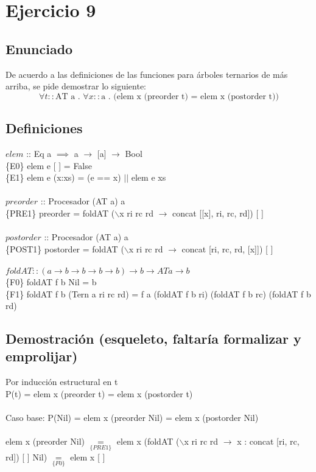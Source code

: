 \documentclass[10pt,a4paper]{article}
\begin{document}
\maketitle


\section*{Ejercicio 9}
\subsection*{Enunciado}
De acuerdo a las definiciones de las funciones para árboles ternarios de más arriba, se pide
demostrar lo siguiente: \\
\begin{equation*}
	\forall t :: \text{AT a . }\forall x :: \text{a . (elem x (preorder t) = elem x (postorder t))} 
\end{equation*}

\subsection*{Definiciones}
\noindent
$elem$ :: Eq a  $\implies$ a $\rightarrow$ [a] $\rightarrow$ Bool \\
\{E0\} elem e [ ] = False \\
\{E1\} elem e (x:xs) = (e == x) $||$ elem e xs \\
\\
$preorder$ :: Procesador (AT a) a \\
\{PRE1\} preorder = foldAT ($\backslash$x ri rc rd $\rightarrow$ concat [[x], ri, rc, rd]) [ ]\\
\\
$postorder$ :: Procesador (AT a) a \\
\{POST1\} postorder = foldAT ($\backslash$x ri rc rd $\rightarrow$ concat [ri, rc, rd, [x]]) [ ]\\
\\
$foldAT :: (a \rightarrow b \rightarrow b \rightarrow b \rightarrow b) \rightarrow b \rightarrow AT a \rightarrow b $\\
\{F0\} foldAT f b Nil = b\\
\{F1\} foldAT f b (Tern a ri rc rd) = f a (foldAT f b ri) (foldAT f b rc) (foldAT f b rd) \\

\subsection*{Demostración (esqueleto, faltaría formalizar y emprolijar)}
\noindent
Por inducción estructural en t\\
P(t) = elem x (preorder t) = elem x (postorder t) \\ \\
Caso base: P(Nil) = elem x (preorder Nil) = elem x (postorder Nil)\\ \\
elem x (preorder Nil) $\underset{\{PRE1\}}{=}$ elem x (foldAT ($\backslash$x ri rc rd $\rightarrow$ x : concat [ri, rc, rd]) [ ] Nil) $\underset{\{F0\}}{=}$ elem x [ ] \\
\end{document}
